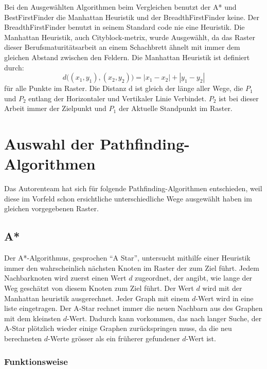 Bei den Ausgewählten Algorithmen beim Vergleichen benutzt der A* und
BestFirstFinder die Manhattan Heuristik und der BreadthFirstFinder
keine. Der BreadthFirstFinder benutzt in seinem Standard code nie eine
Heuristik. Die Manhattan Heuristik, auch Cityblock-metrix, wurde
Ausgewählt, da das Raster dieser Berufsmaturitätsarbeit an einem Schachbrett
ähnelt mit immer dem gleichen Abstand zwischen den Feldern.
Die Manhattan Heuristik ist definiert durch:
\begin{equation*}
d\big((x_1,y_1),(x_2,y_2)\big) = |x_1 - x_{2}| + |y_{1} - y_{2}|
\end{equation*}
für alle Punkte im Raster. Die Distanz d ist gleich der länge aller Wege, die $P_1$ und $P_2$ entlang der Horizontaler und Vertikaler Linie Verbindet. $P_2$ ist bei dieser Arbeit immer der Zielpunkt und $P_1$ der
Aktuelle Standpunkt im Raster. \cite[Patel, 2019]{heuristicsredblob}

\section{Auswahl der Pathfinding-Algorithmen}

Das Autorenteam hat sich für folgende Pathfinding-Algorithmen
entschieden, weil diese im Vorfeld schon ersichtliche unterschiedliche
Wege ausgewählt haben im gleichen vorgegebenen Raster.

\subsection{A*}

Der A*-Algorithmus, gesprochen ``A Star'', untersucht mithilfe einer
Heuristik immer den wahrscheinlich nächsten Knoten im Raster der zum
Ziel führt. Jedem Nachbarknoten wird zuerst einen Wert $d$ zugeordnet, der
angibt, wie lange der Weg geschätzt von diesem Knoten zum Ziel führt. Der Wert $d$
wird mit der Manhattan heuristik ausgerechnet. Jeder Graph mit einem $d$-Wert 
wird in eine liste eingetragen. Der A-Star rechnet immer die neuen
Nachbarn aus des Graphen mit dem kleinsten $d$-Wert. Dadurch kann
vorkommen, das nach langer Suche, der A-Star plötzlich wieder einige
Graphen zurückspringen muss, da die neu berechneten $d$-Werte grösser als
ein früherer gefundener $d$-Wert ist.
\cite[Schmidt, Fuchs]{asterngeo}

\subsubsection{Funktionsweise}

